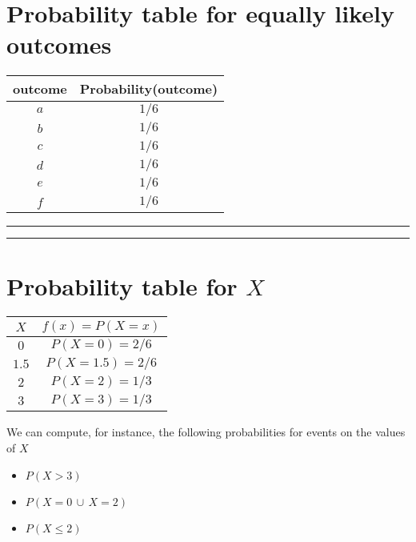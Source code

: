 \documentclass[
]{book}
\providecommand{\tightlist}{%
  \setlength{\itemsep}{0pt}\setlength{\parskip}{0pt}}
\begin{document}
\hypertarget{probability-table-for-equally-likely-outcomes}{%
\section{Probability table for equally likely outcomes}\label{probability-table-for-equally-likely-outcomes}}

\begin{longtable}[]{@{}cc@{}}
\toprule
outcome & Probability(outcome) \\
\midrule
\endhead
\(a\) & \(1/6\) \\
\(b\) & \(1/6\) \\
\(c\) & \(1/6\) \\
\(d\) & \(1/6\) \\
\(e\) & \(1/6\) \\
\(f\) & \(1/6\) \\
\bottomrule
\end{longtable}

\begin{center}\rule{0.5\linewidth}{0.5pt}\end{center}

\begin{center}\rule{0.5\linewidth}{0.5pt}\end{center}

\hypertarget{probability-table-for-x}{%
\section{\texorpdfstring{Probability table for \(X\)}{Probability table for X}}\label{probability-table-for-x}}

\begin{longtable}[]{@{}cc@{}}
\toprule
\(X\) & \(f(x)=P(X=x)\) \\
\midrule
\endhead
\(0\) & \(P(X=0)=2/6\) \\
\(1.5\) & \(P(X=1.5)=2/6\) \\
\(2\) & \(P(X=2)=1/3\) \\
\(3\) & \(P(X=3)=1/3\) \\
\bottomrule
\end{longtable}

We can compute, for instance, the following probabilities for events on the values of \(X\)

\begin{itemize}
\tightlist
\item
  \(P(X>3)\)
\item
  \(P(X=0\, \cup \, X=2 )\)
\item
  \(P(X \leq 2)\)
\end{itemize}
\end{document}
